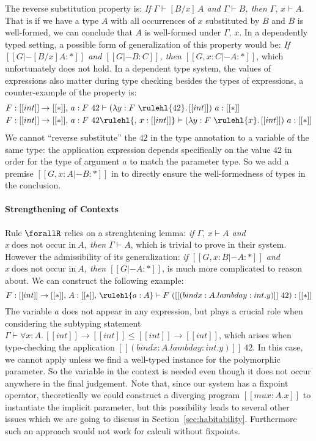 The reverse substitution property is:
\emph{If $\Gamma \vdash [B / x] \, A$ and $\Gamma \vdash B$, then $\Gamma,\, x \vdash A$}.
That is if we have a type $A$ with all occurrences of $x$ substituted by $B$ and $B$
is well-formed, we can conclude that $A$ is well-formed under $\Gamma,\, x$.
In a dependently typed setting, a possible form of generalization of this property
would be:
\emph{If $[[G |- [B / x] A : *]]$ and $[[G |- B : C]]$, then $[[G , x : C |- A : *]]$},
which unfortunately does not hold.
In a dependent type system, the values of expressions also matter during type checking
besides the types of expressions, a counter-example of the property is:
\begin{align*}
& F : [[int]] \rightarrow [[*]],\, a : F~42  \vdash (\lambda y : F~\rulehl{42}.\, [[int]]) ~ a : [[*]] \\
& F : [[int]] \rightarrow [[*]],\, a : F~42  \rulehl{,\, x : [[int]]} \vdash (\lambda y : F~\rulehl{x}.\, [[int]]) ~ a : [[*]]
\end{align*}
We cannot ``reverse substitute'' the $42$ in the type annotation to a variable
of the same type: the application expression depends specifically on the value
$42$ in order for the type of argument $a$ to match the parameter type.
So we add a premise $[[G , x : A |- B : *]]$ in  to directly
ensure the well-formedness of types in the conclusion.

\paragraph*{Strengthening of Contexts}
\label{sec:strengthening}

Rule $\forallR$ relies on a strenghtening lemma:
\emph{if $\Gamma,\, x \vdash A$ and $x ~\text{does not occur in}~ A$, then $\Gamma \vdash A$}, which
is trivial to prove in their system.
However the admissibility of its generalization:
\emph{if $[[G, x : B |- A : *]]$ and $x ~\text{does not occur in}~ A$, then $[[G |- A : *]]$},
is much more complicated to reason about. We can construct the following example:
\begin{equation*}
    F : [[int]] \rightarrow [[*]],\, A : [[*]],\, \rulehl{a : A} \vdash F ~ ([[(bind x : A. lambda y : int. y)]]~ 42) : [[*]]
\end{equation*}
The variable $a$ does not appear in any expression, but plays a
crucial role when considering the subtyping statement
$\Gamma \vdash \forall x : A.\, [[int]] \rightarrow [[int]] \le [[int]] \rightarrow [[int]]$,
which arises when type-checking the application $[[(bind x : A. lambda y : int. y)]]~42$.
In this case, we cannot apply  unless we find a
well-typed instance for the polymorphic parameter. So the variable in the context
is needed even though it does not occur anywhere in the final judgement.
Note that, since our system has a fixpoint operator, theoretically we could construct
a diverging program $[[mu x : A. x]]$ to instantiate the implicit parameter, but
this possibility leads to several other issues which we are going to discuss in
Section~\ref{sec:habitability}. Furthermore such an approach would not work for calculi
without fixpoints.

